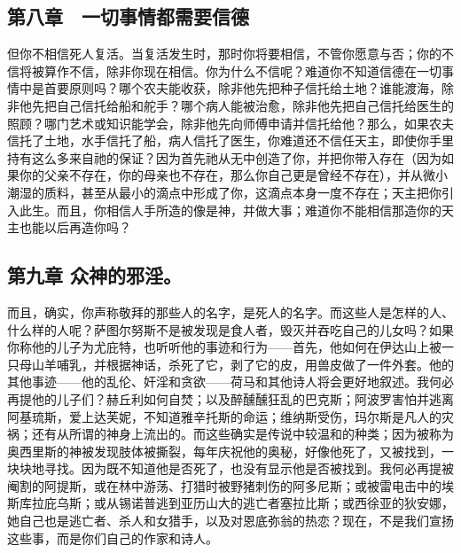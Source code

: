 
\subsection{第八章　一切事情都需要信德}

但你不相信死人复活。当复活发生时，那时你将要相信，不管你愿意与否；你的不信将被算作不信，除非你现在相信。你为什么不信呢？难道你不知道信德在一切事情中是首要原则吗？哪个农夫能收获，除非他先把种子信托给土地？谁能渡海，除非他先把自己信托给船和舵手？哪个病人能被治愈，除非他先把自己信托给医生的照顾？哪门艺术或知识能学会，除非他先向师傅申请并信托给他？那么，如果农夫信托了土地，水手信托了船，病人信托了医生，你难道还不信任天主，即使你手里持有这么多来自祂的保证？因为首先祂从无中创造了你，并把你带入存在（因为如果你的父亲不存在，你的母亲也不存在，那么你自己更是曾经不存在），并从微小潮湿的质料，甚至从最小的滴点中形成了你，这滴点本身一度不存在；天主把你引入此生。而且，你相信人手所造的像是神，并做大事；难道你不能相信那造你的天主也能以后再造你吗？\par


\subsection{第九章 众神的邪淫。}

而且，确实，你声称敬拜的那些人的名字，是死人的名字。而这些人是怎样的人、什么样的人呢？萨图尔努斯不是被发现是食人者，毁灭并吞吃自己的儿女吗？如果你称他的儿子为尤庇特，也听听他的事迹和行为——首先，他如何在伊达山上被一只母山羊哺乳，并根据神话，杀死了它，剥了它的皮，用兽皮做了一件外套。他的其他事迹——他的乱伦、奸淫和贪欲——荷马和其他诗人将会更好地叙述。我何必再提他的儿子们？赫丘利如何自焚；以及醉醺醺狂乱的巴克斯；阿波罗害怕并逃离阿基琉斯，爱上达芙妮，不知道雅辛托斯的命运；维纳斯受伤，玛尔斯是凡人的灾祸；还有从所谓的神身上流出的。而这些确实是传说中较温和的种类；因为被称为奥西里斯的神被发现肢体被撕裂，每年庆祝他的奥秘，好像他死了，又被找到，一块块地寻找。因为既不知道他是否死了，也没有显示他是否被找到。我何必再提被阉割的阿提斯，或在林中游荡、打猎时被野猪刺伤的阿多尼斯；或被雷电击中的埃斯库拉庇乌斯；或从锡诺普逃到亚历山大的逃亡者塞拉比斯；或西徐亚的狄安娜，她自己也是逃亡者、杀人和女猎手，以及对恩底弥翁的热恋？现在，不是我们宣扬这些事，而是你们自己的作家和诗人。\par

